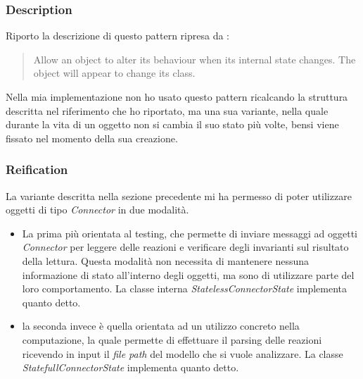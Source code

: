 \subsubsection*{Description}
Riporto la descrizione di questo pattern ripresa da
\cite[p. 327]{SmalltalkCompanion98}:
\begin{quotation}
Allow an object to alter its behaviour when its internal state
changes. The object will appear to change its class.    
\end{quotation}
Nella mia implementazione non ho usato questo pattern ricalcando la
struttura descritta nel riferimento che ho riportato, ma una sua
variante, nella quale durante la vita di un oggetto non si cambia il
suo stato pi\`u volte, bensi viene fissato nel momento della sua
creazione.

\subsubsection*{Reification}
La variante descritta nella sezione precedente mi ha permesso di poter
utilizzare oggetti di tipo \emph{Connector} in due modalit\`a.
\begin{itemize}
\item La prima pi\`u orientata al testing, che permette di inviare
  messaggi ad oggetti \emph{Connector} per leggere delle reazioni e
  verificare degli invarianti sul risultato della lettura. Questa
  modalit\`a non necessita di mantenere nessuna informazione di stato
  all'interno degli oggetti, ma sono di utilizzare parte del loro
  comportamento. La classe interna \emph{StatelessConnectorState}
  implementa quanto detto.
\item la seconda invece \`e quella orientata ad un utilizzo concreto
  nella computazione, la quale permette di effettuare il parsing delle
  reazioni ricevendo in input il \emph{file path} del modello che si
  vuole analizzare. La classe \emph{StatefullConnectorState}
  implementa quanto detto.
\end{itemize}


